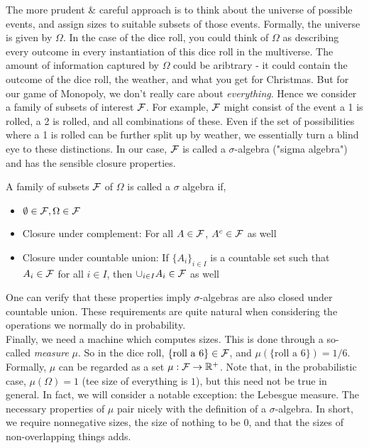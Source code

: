The more prudent \& careful approach is to think about the universe of possible events, and assign
sizes to suitable subsets of those events. Formally, the universe is given by $\Omega$. In the case of the dice 
roll, you could think of $\Omega$ as describing every outcome in every instantiation of this dice roll in the 
multiverse. The amount of information captured by $\Omega$ could be aribtrary - it could contain the outcome of the 
dice roll, the weather, and what you get for Christmas. But for our game of Monopoly, we don't really care 
about \emph{everything}. Hence we consider a family of subsets of interest $\mathcal F$. For example, $\mathcal F$ might consist of 
the event a 1 is rolled, a 2 is rolled, and all combinations of these. Even if the set of possibilities where a 1 is rolled 
can be further split up by weather, we essentially turn a blind eye to these distinctions. In our case, 
$\mathcal F$ is called a $\sigma$-algebra ("sigma algebra") and has the sensible closure properties. 

\begin{definition} \label{def:sigma algebra} A family of subsets $\mathcal F$ of $\Omega$ is called a $\sigma$ algebra if,
\begin{itemize}
    \item $\emptyset \in \mathcal F, \Omega \in \mathcal F$
    \item Closure under complement: For all $A \in \mathcal F$, $A^c \in \mathcal F$ as well
    \item Closure under countable union: If $\{A_i\}_{i \in I}$ is a countable set such that $A_i \in \mathcal F$ for all $i \in I$, then 
        $\cup_{i \in I}A_i \in \mathcal F$ as well
\end{itemize}
\end{definition}

One can verify that these properties imply $\sigma$-algebras are also closed under countable union. These 
requirements are quite natural when considering the operations we normally do in probability.\\

Finally, we need a 
machine which computes sizes. This is done through a so-called \emph{measure} $\mu$. 
So in the dice roll, $\{\text{roll a 6}\} \in \mathcal F$, and $\mu(\{\text{roll a 6}\}) = 1/6$.
Formally, $\mu$ can be 
regarded as a set $\mu : \mathcal F \to \mathbb R^+$. Note that, in the probabilistic case, 
$\mu(\Omega) = 1$ (tee size of everything is $1$), but this need not be true in general. In fact, we 
will consider a notable exception: the Lebesgue measure. The necessary properties of 
$\mu$ pair nicely with the definition of a $\sigma$-algebra. In short, we require nonnegative 
sizes, the size of nothing to be $0$, and that the sizes of non-overlapping things adds.

